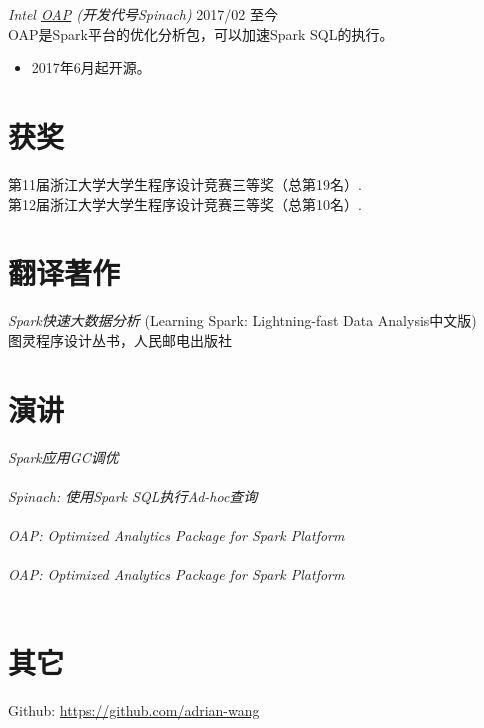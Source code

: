 \documentclass[line,margin]{res}
\begin{document}
\begin{resume}
                {\sl Intel \href{https://github.com/Intel-bigdata/OAP}{OAP} (开发代号Spinach)}
                  \hfill 2017/02 至今\\
                OAP是Spark平台的优化分析包，可以加速Spark SQL的执行。
                  \begin{itemize}
                   \item 2017年6月起开源。
                   \end{itemize}

\section{获奖}
            第11届浙江大学大学生程序设计竞赛三等奖（总第19名）.\\
            第12届浙江大学大学生程序设计竞赛三等奖（总第10名）.

\section{翻译著作}
            {\sl Spark快速大数据分析} (Learning Spark: Lightning-fast Data Analysis中文版) \\
            \hfill 图灵程序设计丛书，人民邮电出版社

\section{演讲}
            {\sl Spark应用GC调优}\\
                \\
            {\sl Spinach: 使用Spark SQL执行Ad-hoc查询}\\
                \\
            {\sl OAP: Optimized Analytics Package for Spark Platform}\\
                \\
            {\sl OAP: Optimized Analytics Package for Spark Platform}\\
                \\

\section{其它}
	Github: \href{https://github.com/adrian-wang}{https://github.com/adrian-wang}
\end{resume}
\end{document}

